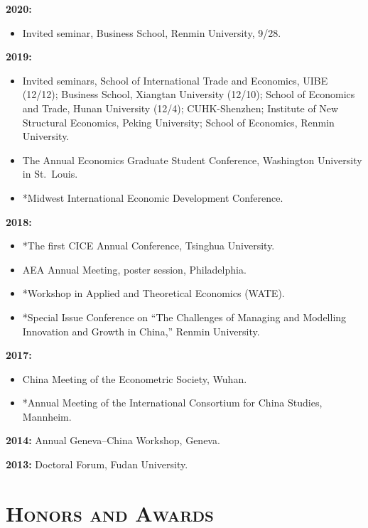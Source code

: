 \documentclass[letterpaper]{article}
\begin{document}
\textbf{2020:}
\begin{itemize}[leftmargin=1.6em, itemsep=0.25em, topsep=0.2em]
  \item Invited seminar, Business School, Renmin University, 9/28.
\end{itemize}

\textbf{2019:}
\begin{itemize}[leftmargin=1.6em, itemsep=0.25em, topsep=0.2em]
  \item Invited seminars, School of International Trade and Economics, UIBE (12/12); Business School, Xiangtan University (12/10); School of Economics and Trade, Hunan University (12/4); CUHK-Shenzhen; Institute of New Structural Economics, Peking University; School of Economics, Renmin University.
  \item The  Annual Economics Graduate Student Conference, Washington University in St.\ Louis.
  \item *Midwest International Economic Development Conference.
\end{itemize}

\textbf{2018:}
\begin{itemize}[leftmargin=1.6em, itemsep=0.25em, topsep=0.2em]
  \item *The first CICE Annual Conference, Tsinghua University.
  \item AEA Annual Meeting, poster session, Philadelphia.
  \item *Workshop in Applied and Theoretical Economics (WATE).
  \item *Special Issue Conference on ``The Challenges of Managing and Modelling Innovation and Growth in China,'' Renmin University.
\end{itemize}

\textbf{2017:}
\begin{itemize}[leftmargin=1.6em, itemsep=0.25em, topsep=0.2em]
  \item China Meeting of the Econometric Society, Wuhan.
  \item *Annual Meeting of the International Consortium for China Studies, Mannheim.
\end{itemize}

\textbf{2014:} Annual Geneva--China Workshop, Geneva.

\vspace{0.3em}
\textbf{2013:} Doctoral Forum, Fudan University.

\section*{\textsc{Honors and Awards}}
\end{document}
